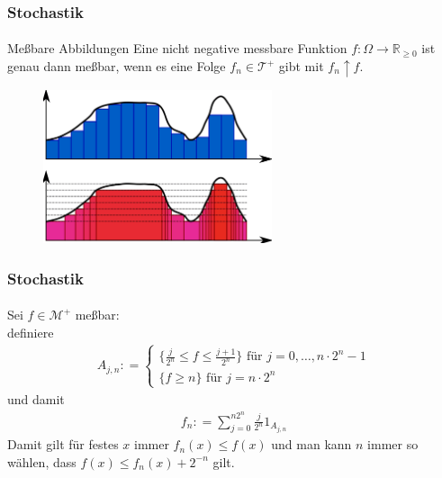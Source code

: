\documentclass{beamer}
\begin{document}
\begin{frame} 
    \frametitle{Stochastik}
\framesubtitle{}
    \begin{block}{Meßbare Abbildungen}
        Eine nicht negative messbare Funktion $f:\Omega \to \mathbb{R}_{\geq 0}$ ist genau dann meßbar, wenn
        es eine Folge $f_n \in \mathcal{T}^+$ gibt mit $f_n \uparrow f$.
    \end{block}
    \begin{figure}[H]
        \centering
      \includegraphics[width=0.6\textwidth]{img/RiemannVsLebesgue.png}
    
    \end{figure}
\end{frame}


\begin{frame}
    \frametitle{Stochastik}
\framesubtitle{}
Sei  $f \in \mathcal{M}^+$ meßbar: \\
definiere
\begin{align*}
    A_{j,n} : = \begin{cases} 
        \{ \frac{j}{2^n} \leq f \leq \frac{j+1}{2^n} \} \text{ für } j= 0, \dots, n \cdot 2^n -1 \\
        \{  f \geq n \} \text{ für } j= n \cdot 2^n 
    \end{cases}
\end{align*}
und damit 
\begin{align*}
    f_n : =  \sum_{j= 0}^{n2^n} \frac{j}{2^n} 1_{A_{j,n}}
\end{align*}
Damit gilt für festes $x$ immer $f_n(x) \leq f(x)$ und man kann $n$ immer so wählen, dass 
$ f(x) \leq f_n(x) +2^{-n}$ gilt.
\end{frame}
\end{document}
